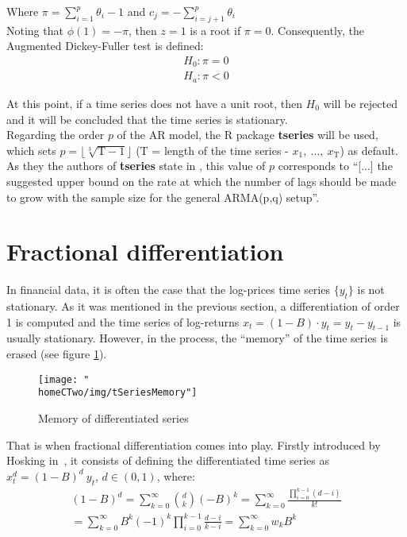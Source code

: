 \documentclass[a4paper]{report}
\newcommand{\homeCTwo}{../../Chapter 2 - FracDiff/Draft}
\begin{document}
Where $\pi = \sum_{i = 1}^p \theta_i -1$ and $c_j = - \sum_{i = j+1}^p 
\theta_i$\\

Noting that $\phi(1) = -\pi$, then $z = 1$ is a root if $\pi = 0$. 
Consequently, the Augmented Dickey-Fuller test is defined:
\begin{align*}
	H_0 : \pi = 0\\
	H_a : \pi < 0
\end{align*}

At this point, if a time series does not have a unit root, then $H_0$ will 
be rejected and it will be concluded that the time series is stationary.\\

Regarding the order $p$ of the AR model, the R package \textbf{tseries} 
\cite{tseriesR} will be used, which sets $p = \lfloor \sqrt[3]{\text{T} - 1} 
\rfloor$ (T  = length of the time series - $x_1 ,\ \ldots ,\ x_\text{T}$) 
as default. As they the authors of \textbf{tseries} state in 
\cite{tseriesR}, this value of $p$ corresponds to ``[...] the suggested 
upper bound on the rate at which the number of lags should be made to grow 
with the sample size for the general ARMA(p,q) setup''.

\section{Fractional differentiation}
\label{sec:fracDiff}
In financial data, it is often the case that the log-prices time series 
$\{ y_t \}$ is not stationary. As it was mentioned in the previous section, a 
differentiation of order 1 is computed and the time series of log-returns 
$x_t = (1 - B) \cdot y_t = y_t - y_{t-1}$ is usually stationary. However, in 
the process, the ``memory'' of the time series is erased (see figure 
\ref{fig:tSeriesMemory}).\\

\begin{figure}[hbtp]
\centering
	\texttt{[image: "\\homeCTwo/img/tSeriesMemory"]}
	\caption{Memory of differentiated series}
	\label{fig:tSeriesMemory}
\end{figure}

That is when fractional differentiation comes into play. Firstly introduced 
by Hosking in~\cite{hosking1981fractional}, it consists of defining the 
differentiated time series as $x_t^d = (1 - B)^d \ y_t$, $d \in (0,1)$, 
where:
\begin{align*}
	(1 - B)^d = \sum_{k = 0}^{\infty} \binom{d}{k} (-B)^k = 
	\sum_{k = 0}^{\infty} \frac{\prod_{i = 0}^{k - 1} (d - i)}{k!}\\
	= \sum_{k = 0}^{\infty} B^k (-1)^k \prod_{i = 0}^{k - 1} 
	\frac{d - i}{k - i} = \sum_{k = 0}^{\infty} w_k B^k
\end{align*}
\end{document}
